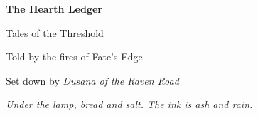 \documentclass[11pt, twoside]{book}
\begin{document}
\frontmatter

\begin{titlepage}
\centering
\vspace*{2cm}
{\huge\bfseries The Hearth Ledger\par}
\vspace{0.5cm}
{\Large Tales of the Threshold\par}
\vspace{2cm}
{\large Told by the fires of Fate's Edge\par}
\vspace{0.5cm}
{\large Set down by \textit{Dusana of the Raven Road}\par}
\vspace{1.5cm}
{\normalsize \textit{Under the lamp, bread and salt. The ink is ash and rain.}\par}
\vfill
\end{titlepage}

\tableofcontents
\newpage



\mainmatter










































\end{document}
